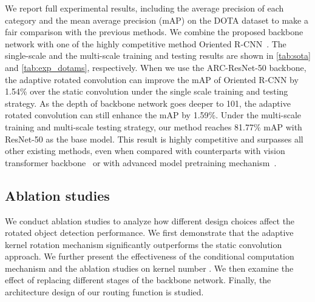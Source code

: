 We report full experimental results, including the average precision of each category and the mean average precision (mAP) on the DOTA dataset to make a fair comparison with the previous methods. We combine the proposed backbone network with one of the highly competitive method Oriented R-CNN~\cite{xie2021oriented}. The single-scale and the multi-scale training and testing results are shown in \cref{tab:sota} and \cref{tab:exp_dotams}, respectively. When we use the ARC-ResNet-50 backbone, the adaptive rotated convolution can improve the mAP of Oriented R-CNN by 1.54\% over the static convolution under the single scale training and testing strategy. As the depth of backbone network goes deeper to 101, the adaptive rotated convolution can still enhance the mAP by 1.59\%. Under the multi-scale training and multi-scale testing strategy, our method reaches 81.77\% mAP with ResNet-50 as the base model. This result is highly competitive and surpasses all other existing methods, even when compared with counterparts with vision transformer backbone~\cite{yang2022kfiou, wang2022advancing} or with advanced model pretraining mechanism~\cite{he2022masked, wang2022advancing}.






\subsection{Ablation studies}
\label{sec:exp_abl}

We conduct ablation studies to analyze how different design choices affect the rotated object detection performance. We first demonstrate that the adaptive kernel rotation mechanism significantly outperforms the static convolution approach. We further present the effectiveness of the conditional computation mechanism and the ablation studies on kernel number . We then examine the effect of replacing different stages of the backbone network. Finally, the architecture design of our routing function is studied. 




